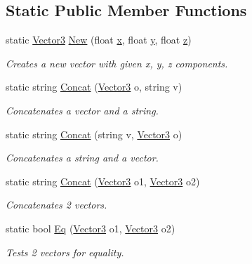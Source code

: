 \subsection*{Static Public Member Functions}
\begin{DoxyCompactItemize}
\item 
static \mbox{\hyperlink{class_lua_1_1_vector3}{Vector3}} \mbox{\hyperlink{class_lua_1_1_vector3_ad6514c4819aa2dabb95253f9d6f5248c}{New}} (float \mbox{\hyperlink{class_lua_1_1_vector3_af2367a6c9fb9484cd8703ef20bbe3e2b}{x}}, float \mbox{\hyperlink{class_lua_1_1_vector3_a93844cc4b95c4b4cc2152ecd3d6a69ed}{y}}, float \mbox{\hyperlink{class_lua_1_1_vector3_a80737d9f0e18357fd716e47a1b82ef6a}{z}})
\begin{DoxyCompactList}\small\item\em Creates a new vector with given x, y, z components. \end{DoxyCompactList}\item 
static string \mbox{\hyperlink{class_lua_1_1_vector3_a7a6a85bde6d3a1072d52ebf902f291e0}{Concat}} (\mbox{\hyperlink{class_lua_1_1_vector3}{Vector3}} o, string v)
\begin{DoxyCompactList}\small\item\em Concatenates a vector and a string. \end{DoxyCompactList}\item 
static string \mbox{\hyperlink{class_lua_1_1_vector3_a185d18054534f55a4ce5f951e157df96}{Concat}} (string v, \mbox{\hyperlink{class_lua_1_1_vector3}{Vector3}} o)
\begin{DoxyCompactList}\small\item\em Concatenates a string and a vector. \end{DoxyCompactList}\item 
static string \mbox{\hyperlink{class_lua_1_1_vector3_aa50462b9cd533a0b1216975d52940d5a}{Concat}} (\mbox{\hyperlink{class_lua_1_1_vector3}{Vector3}} o1, \mbox{\hyperlink{class_lua_1_1_vector3}{Vector3}} o2)
\begin{DoxyCompactList}\small\item\em Concatenates 2 vectors. \end{DoxyCompactList}\item 
static bool \mbox{\hyperlink{class_lua_1_1_vector3_aaa648399828fb59c6ad750f2f3ad09d6}{Eq}} (\mbox{\hyperlink{class_lua_1_1_vector3}{Vector3}} o1, \mbox{\hyperlink{class_lua_1_1_vector3}{Vector3}} o2)
\begin{DoxyCompactList}\small\item\em Tests 2 vectors for equality. \end{DoxyCompactList}\item 

\end{DoxyCompactItemize}
